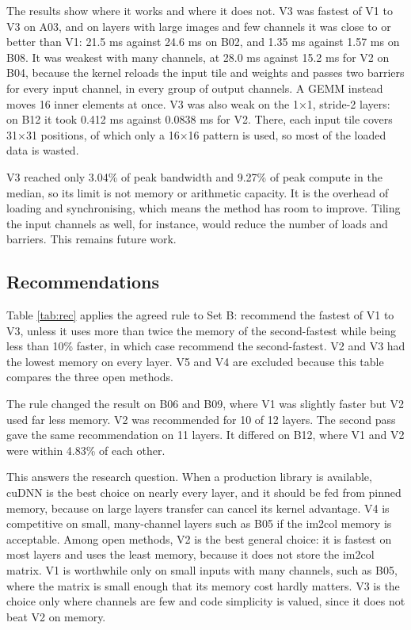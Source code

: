 \documentclass[12pt,a4paper]{article}
\newcommand{\gentable}[3][\small]{%
  \begin{table}[H]\centering{#1}\caption{#3}\end{table}}
\begin{document}
The results show where it works and where it does not. V3 was fastest of V1 to V3 on A03, and on layers with large images and few channels it was close to or better than V1: 21.5 ms against 24.6 ms on B02, and 1.35 ms against 1.57 ms on B08. It was weakest with many channels, at 28.0 ms against 15.2 ms for V2 on B04, because the kernel reloads the input tile and weights and passes two barriers for every input channel, in every group of output channels. A GEMM instead moves 16 inner elements at once. V3 was also weak on the 1×1, stride-2 layers: on B12 it took 0.412 ms against 0.0838 ms for V2. There, each input tile covers 31×31 positions, of which only a 16×16 pattern is used, so most of the loaded data is wasted.

V3 reached only 3.04\% of peak bandwidth and 9.27\% of peak compute in the median, so its limit is not memory or arithmetic capacity. It is the overhead of loading and synchronising, which means the method has room to improve. Tiling the input channels as well, for instance, would reduce the number of loads and barriers. This remains future work.

\subsection{Recommendations}
Table \ref{tab:rec} applies the agreed rule to Set B: recommend the fastest of V1 to V3, unless it uses more than twice the memory of the second-fastest while being less than 10\% faster, in which case recommend the second-fastest. V2 and V3 had the lowest memory on every layer. V5 and V4 are excluded because this table compares the three open methods.

The rule changed the result on B06 and B09, where V1 was slightly faster but V2 used far less memory. V2 was recommended for 10 of 12 layers. The second pass gave the same recommendation on 11 layers. It differed on B12, where V1 and V2 were within 4.83\% of each other.

\gentable{recommendation}{Recommended method for each Set B layer. Lead is the fastest method's lead over the second-fastest\label{tab:rec}}

This answers the research question. When a production library is available, cuDNN is the best choice on nearly every layer, and it should be fed from pinned memory, because on large layers transfer can cancel its kernel advantage. V4 is competitive on small, many-channel layers such as B05 if the im2col memory is acceptable. Among open methods, V2 is the best general choice: it is fastest on most layers and uses the least memory, because it does not store the im2col matrix. V1 is worthwhile only on small inputs with many channels, such as B05, where the matrix is small enough that its memory cost hardly matters. V3 is the choice only where channels are few and code simplicity is valued, since it does not beat V2 on memory.
\end{document}
